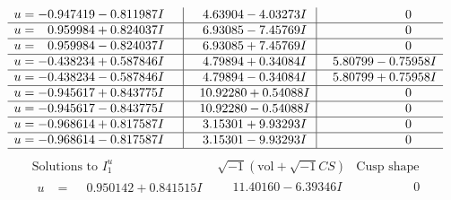\documentclass[1p]{elsarticle_modified}
\theoremstyle{definition}
\newcommand{\I}{\sqrt{-1}}
\begin{document}
$$\begin{array}{c|c|c}
\begin{aligned}
u &= -0.947419 - 0.811987 I\end{aligned}
 & \phantom{-}4.63904 - 4.03273 I & \phantom{-0.000000 } 0 \\ \hline\begin{aligned}
u &= \phantom{-}0.959984 + 0.824037 I\end{aligned}
 & \phantom{-}6.93085 - 7.45769 I & \phantom{-0.000000 } 0 \\ \hline\begin{aligned}
u &= \phantom{-}0.959984 - 0.824037 I\end{aligned}
 & \phantom{-}6.93085 + 7.45769 I & \phantom{-0.000000 } 0 \\ \hline\begin{aligned}
u &= -0.438234 + 0.587846 I\end{aligned}
 & \phantom{-}4.79894 + 0.34084 I & \phantom{-}5.80799 - 0.75958 I \\ \hline\begin{aligned}
u &= -0.438234 - 0.587846 I\end{aligned}
 & \phantom{-}4.79894 - 0.34084 I & \phantom{-}5.80799 + 0.75958 I \\ \hline\begin{aligned}
u &= -0.945617 + 0.843775 I\end{aligned}
 & \phantom{-}10.92280 + 0.54088 I & \phantom{-0.000000 } 0 \\ \hline\begin{aligned}
u &= -0.945617 - 0.843775 I\end{aligned}
 & \phantom{-}10.92280 - 0.54088 I & \phantom{-0.000000 } 0 \\ \hline\begin{aligned}
u &= -0.968614 + 0.817587 I\end{aligned}
 & \phantom{-}3.15301 + 9.93293 I & \phantom{-0.000000 } 0 \\ \hline\begin{aligned}
u &= -0.968614 - 0.817587 I\end{aligned}
 & \phantom{-}3.15301 - 9.93293 I & \phantom{-0.000000 } 0\\
 \hline 
 \end{array}$$\newpage$$\begin{array}{c|c|c}  
\text{Solutions to }I^u_{1}& \I (\text{vol} + \sqrt{-1}CS) & \text{Cusp shape}\\
 \hline 
\begin{aligned}
u &= \phantom{-}0.950142 + 0.841515 I\end{aligned}
 & \phantom{-}11.40160 - 6.39346 I & \phantom{-0.000000 } 0 \\ \hline\begin{aligned}

\end{aligned}
\end{array}$$
\end{document}
